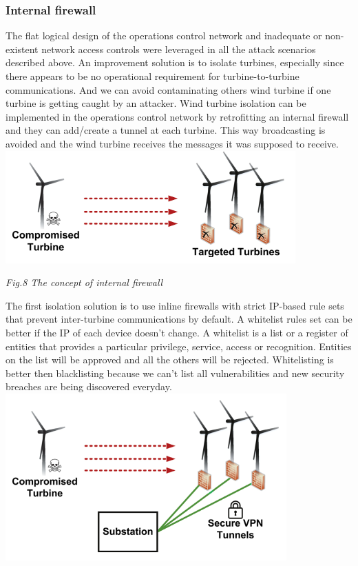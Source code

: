 \documentclass[twosided,a4,10pt]{article}
\begin{document}
\begin{multicols}{2}
\subsubsection{Internal firewall}
The flat logical design of the operations control network and inadequate or non-existent network access controls were leveraged in all the attack scenarios described above. An improvement solution is to isolate turbines, especially since there appears to be no operational requirement for turbine-to-turbine communications. And we can avoid contaminating  others wind turbine if one turbine is getting caught by an attacker. Wind turbine isolation can be implemented in the operations control network by retrofitting an internal firewall and they can add/create a tunnel at each turbine. This way broadcasting is avoided and the wind turbine receives the messages it was supposed to receive.
\includegraphics[scale=0.8]{internalfirewall}
\begin{center}
	\textit{Fig.8 The concept of internal firewall}
\end{center}
The first isolation solution is to use inline firewalls with strict IP-based rule sets that prevent inter-turbine communications by default. A whitelist rules set can be better if the IP of each device doesn't change. A whitelist is a list or a register of entities that provides a particular privilege, service, access or recognition. Entities on the list will be approved and all the others will be rejected. Whitelisting is better then blacklisting because we can't list all vulnerabilities and new security breaches are being discovered everyday.
\includegraphics[scale=0.85]{vpn}

\end{multicols}
\end{document}
